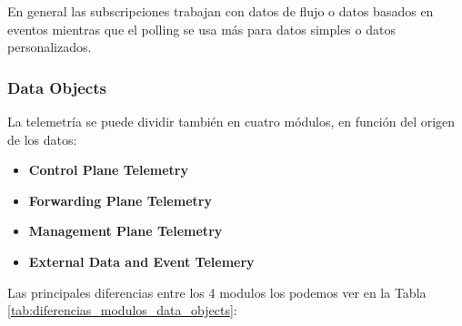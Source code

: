 En general las subscripciones trabajan con datos de flujo o datos basados en eventos mientras que el polling se usa más para datos simples o datos personalizados.


\subsubsection{Data Objects}
La telemetría se puede dividir también en cuatro módulos, en función del origen de los datos:

\begin{itemize}
    \item \textbf{Control Plane Telemetry}
    \item \textbf{Forwarding Plane Telemetry}
    \item \textbf{Management Plane Telemetry}
    \item \textbf{External Data and Event Telemery}
\end{itemize}


Las principales diferencias entre los 4 modulos los podemos ver en la Tabla \ref{tab:diferencias_modulos_data_objects}:
        
        
        
        
        
        
